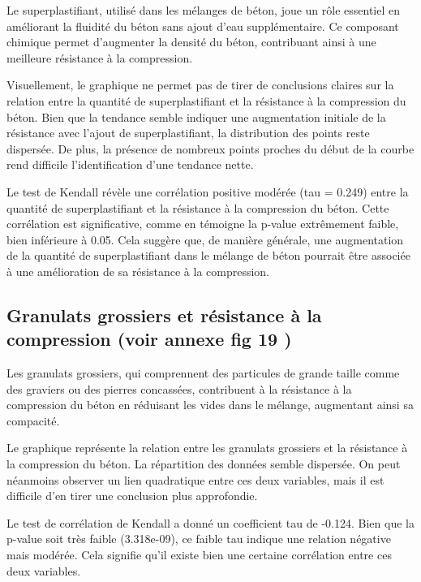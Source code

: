 \documentclass[
  12pt,
]{article}
\begin{document}
Le superplastifiant, utilisé dans les mélanges de béton, joue un rôle
essentiel en améliorant la fluidité du béton sans ajout d'eau
supplémentaire. Ce composant chimique permet d'augmenter la densité du
béton, contribuant ainsi à une meilleure résistance à la compression.

Visuellement, le graphique ne permet pas de tirer de conclusions claires
sur la relation entre la quantité de superplastifiant et la résistance à
la compression du béton. Bien que la tendance semble indiquer une
augmentation initiale de la résistance avec l'ajout de superplastifiant,
la distribution des points reste dispersée. De plus, la présence de
nombreux points proches du début de la courbe rend difficile
l'identification d'une tendance nette.

Le test de Kendall révèle une corrélation positive modérée (tau = 0.249)
entre la quantité de superplastifiant et la résistance à la compression
du béton. Cette corrélation est significative, comme en témoigne la
p-value extrêmement faible, bien inférieure à 0.05. Cela suggère que, de
manière générale, une augmentation de la quantité de superplastifiant
dans le mélange de béton pourrait être associée à une amélioration de sa
résistance à la compression.

\subsection{Granulats grossiers et résistance à la compression (voir
annexe fig 19
)}\label{granulats-grossiers-et-ruxe9sistance-uxe0-la-compression-voir-annexe-fig-19}

Les granulats grossiers, qui comprennent des particules de grande taille
comme des graviers ou des pierres concassées, contribuent à la
résistance à la compression du béton en réduisant les vides dans le
mélange, augmentant ainsi sa compacité.

Le graphique représente la relation entre les granulats grossiers et la
résistance à la compression du béton. La répartition des données semble
dispersée. On peut néanmoins observer un lien quadratique entre ces deux
variables, mais il est difficile d'en tirer une conclusion plus
approfondie.

Le test de corrélation de Kendall a donné un coefficient tau de -0.124.
Bien que la p-value soit très faible (3.318e-09), ce faible tau indique
une relation négative mais modérée. Cela signifie qu'il existe bien une
certaine corrélation entre ces deux variables.
\end{document}
